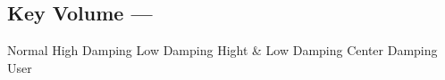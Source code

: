 \subsection[Key Volume]{Key Volume --- \UiKey{\I}\UiKey{\SET}}









































Normal
High Damping
Low Damping
Hight \& Low Damping
Center Damping
User

